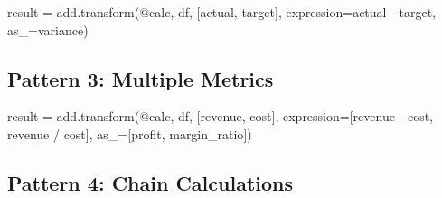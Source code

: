 \documentclass[
  letterpaper,
]{scrbook}
\newenvironment{Shaded}{\begin{snugshade}}{\end{snugshade}}
\newcommand{\NormalTok}[1]{\textcolor[rgb]{0.00,0.23,0.31}{#1}}
\newcommand{\OperatorTok}[1]{\textcolor[rgb]{0.37,0.37,0.37}{#1}}
\newcommand{\StringTok}[1]{\textcolor[rgb]{0.13,0.47,0.30}{#1}}
\begin{document}
\begin{Shaded}
\begin{Highlighting}[]
\NormalTok{result }\OperatorTok{=}\NormalTok{ add.transform(}\StringTok{\textquotesingle{}@calc\textquotesingle{}}\NormalTok{, df, [}\StringTok{\textquotesingle{}actual\textquotesingle{}}\NormalTok{, }\StringTok{\textquotesingle{}target\textquotesingle{}}\NormalTok{], }
\NormalTok{                       expression}\OperatorTok{=}\StringTok{\textquotesingle{}actual {-} target\textquotesingle{}}\NormalTok{, as\_}\OperatorTok{=}\StringTok{\textquotesingle{}variance\textquotesingle{}}\NormalTok{)}
\end{Highlighting}
\end{Shaded}

\subsection{Pattern 3: Multiple
Metrics}\label{pattern-3-multiple-metrics}

\begin{Shaded}
\begin{Highlighting}[]
\NormalTok{result }\OperatorTok{=}\NormalTok{ add.transform(}\StringTok{\textquotesingle{}@calc\textquotesingle{}}\NormalTok{, df, [}\StringTok{\textquotesingle{}revenue\textquotesingle{}}\NormalTok{, }\StringTok{\textquotesingle{}cost\textquotesingle{}}\NormalTok{], }
\NormalTok{                       expression}\OperatorTok{=}\NormalTok{[}\StringTok{\textquotesingle{}revenue {-} cost\textquotesingle{}}\NormalTok{, }\StringTok{\textquotesingle{}revenue / cost\textquotesingle{}}\NormalTok{],}
\NormalTok{                       as\_}\OperatorTok{=}\NormalTok{[}\StringTok{\textquotesingle{}profit\textquotesingle{}}\NormalTok{, }\StringTok{\textquotesingle{}margin\_ratio\textquotesingle{}}\NormalTok{])}
\end{Highlighting}
\end{Shaded}

\subsection{Pattern 4: Chain
Calculations}\label{pattern-4-chain-calculations}
\end{document}
